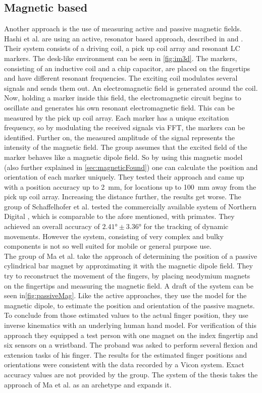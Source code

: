 \subsection{Magnetic based} \label{subsec:approaches:magnetic}
Another approach is the use of measuring active and passive magnetic fields. Hashi et al. are using an active, resonator based approach, described in \cite{hashi2006wireless} and \cite{huang2014im3d}. Their system consists of a driving coil, a pick up coil array and resonant LC markers. The desk-like environment can be seen in \ref{fig:im3d}. The markers, consisting of an inductive coil and a chip capacitor, are placed on the fingertips and have different resonant frequencies. The exciting coil modulates several signals and sends them out. An electromagnetic field is generated around the coil. Now, holding a marker inside this field, the electromagnetic circuit begins to oscillate and generates his own resonant electromagnetic field. This can be measured by the pick up coil array. Each marker has a unique excitation frequency, so by modulating the received signals via \ac{FFT}, the markers can be identified. Further on, the measured amplitude of the signal represents the intensity of the magnetic field. The group assumes that the excited field of the marker behaves like a magnetic dipole field. So by using this magnetic model (also further explained in \ref{sec:magneticFound}) one can calculate the position and orientation of each marker uniquely. They tested their approach and came up with a position accuracy up to \SI{2}{\mm}, for locations up to \SI{100}{mm} away from the pick up coil array. Increasing the distance further, the results get worse. The group of Schaffelhofer et al. tested the commercially available system of Northern Digital \cite{wave}, which is comparable to the afore mentioned, with primates. They achieved an overall accuracy of $ \ang{2.41} \pm \ang{3.36} $ for the tracking of dynamic movements. However the system, consisting of very complex and bulky components is not so well suited for mobile or general purpose use.\\
The group of Ma et al. take the approach of determining the position of a passive cylindrical bar magnet by approximating it with the magnetic dipole field. They try to reconstruct the movement of the fingers, by placing neodymium magnets on the fingertips and measuring the magnetic field. A draft of the system can be seen in\ref{fig:passiveMag}. Like the active approaches, they use the model for the magnetic dipole, to estimate the position and orientation of the passive magnets. To conclude from those estimated values to the actual finger position, they use inverse kinematics with an underlying human hand model. For verification of this approach they equipped a test person with one magnet on the index fingertip and six sensors on a wristband. The proband was asked to perform several flexion and extension tasks of his finger. The results for the estimated finger positions and orientations were consistent with the data recorded by a Vicon system. Exact accuracy values are not provided by the group. The system of the thesis takes the approach of Ma et al. as an archetype and expands it.
